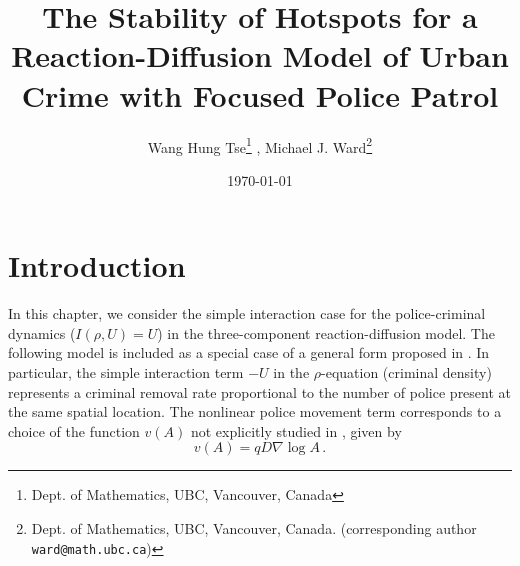 \documentclass{article}%
\begin{document}
\title{The Stability of Hotspots for a Reaction-Diffusion Model of Urban
Crime with Focused Police Patrol}
\date{\today} \author{Wang Hung Tse\thanks{Dept. of Mathematics, UBC,
     Vancouver, Canada} \enspace,
  Michael J. Ward\thanks{Dept. of Mathematics, UBC, Vancouver,
    Canada. (corresponding author {\tt ward@math.ubc.ca})}}
\baselineskip=16pt

\maketitle

\begin{abstract}

\end{abstract}


\setcounter{equation}{0}
\setcounter{section}{0}
\section{Introduction}\label{sec:int}

In this chapter, we consider the simple interaction case for the
police-criminal dynamics ($I(\rho,U)=U$) in the three-component
reaction-diffusion model. The following model is included as a special
case of a general form proposed in \cite{rick}. In particular, the
simple interaction term $-U$ in the $\rho$-equation (criminal density)
represents a criminal removal rate proportional to the number of
police present at the same spatial location. The nonlinear police
movement term corresponds to a choice of the function $v(A)$ not
explicitly studied in \cite{rick}, given by
\[
v(A)=qD\nabla\log A \,.
\]
\end{document}
